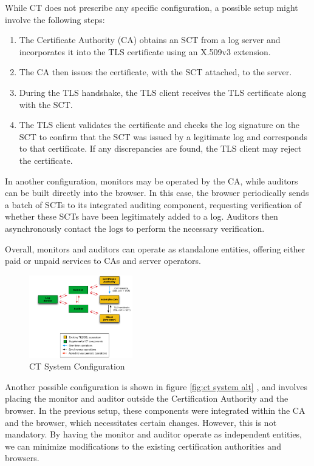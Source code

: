 While CT does not prescribe any specific configuration, a possible
setup might involve the following steps:
\begin{enumerate}
  \item The Certificate Authority (CA) obtains an SCT from a log
    server and incorporates it into the TLS certificate using an
    X.509v3 extension.
  \item The CA then issues the certificate, with the SCT attached, to
    the server.
  \item During the TLS handshake, the TLS client receives the TLS
    certificate along with the SCT.
  \item The TLS client validates the certificate and checks the log
    signature on the SCT to confirm that the SCT was issued by a
    legitimate log and corresponds to that certificate. If any
    discrepancies are found, the TLS client may reject the
    certificate.
\end{enumerate}

In another configuration, monitors may be operated by the CA, while
auditors can be built directly into the browser. In this case, the
browser periodically sends a batch of SCTs to its integrated auditing
component, requesting verification of whether these SCTs have been
legitimately added to a log. Auditors then asynchronously contact the
logs to perform the necessary verification.

Overall, monitors and auditors can operate as standalone entities,
offering either paid or unpaid services to CAs and server operators.

\begin{figure}
  \centering
  \includegraphics[width=0.4\textwidth]{img/x509 ct system alt.png}
  \caption{CT System Configuration}
  \label{fig:ct system alt}

\end{figure}

Another possible configuration is shown in figure \ref{fig:ct system
alt} , and involves placing the monitor and auditor outside the
Certification Authority  and the browser. In the previous setup, these
components were integrated within the CA and the browser, which
necessitates certain changes. However, this is not mandatory. By
having the monitor and auditor operate as independent entities, we can
minimize modifications to the existing certification authorities and
browsers.

